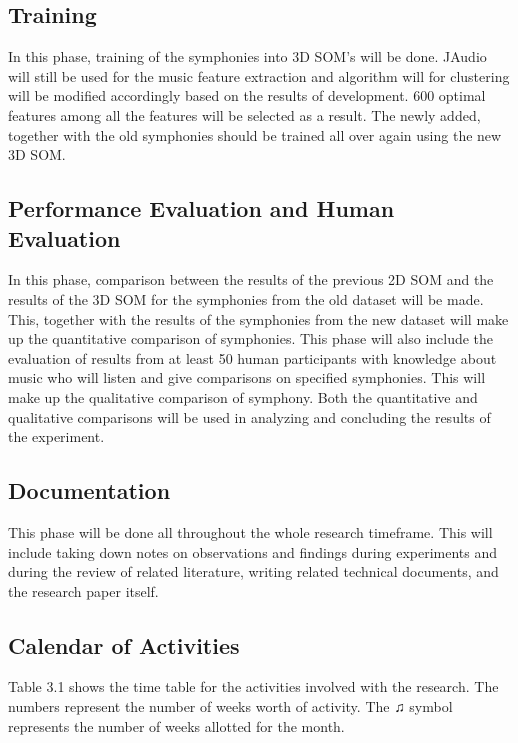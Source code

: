 \subsection{Training}
In this phase, training of the symphonies into 3D SOM’s will be done. JAudio will still be used for the music feature extraction and algorithm will for clustering will be modified accordingly based on the results of development. 600 optimal features among all the features will be selected as a result. The newly added, together with the old symphonies should be trained all over again using the new 3D SOM.

\subsection{Performance Evaluation and Human Evaluation}
In this phase, comparison between the results of the previous 2D SOM and the results of the 3D SOM for the symphonies from the old dataset will be made. This, together with the results of the symphonies from the new dataset will make up the quantitative comparison of symphonies. This phase will also include the evaluation of results from at least 50 human participants with knowledge about music who will listen and give comparisons on specified symphonies. This will make up the qualitative comparison of symphony. Both the quantitative and qualitative comparisons will be used in analyzing and concluding the results of the experiment.
\subsection{Documentation}
This phase will be done all throughout the whole research timeframe. This will include taking down notes on observations and findings during experiments and during the review of related literature, writing related technical documents, and the research paper itself.


\subsection{Calendar of Activities}
Table 3.1 shows the time table for the activities involved with the research. The numbers represent the number of weeks worth of activity. The ♫ symbol represents the number of weeks allotted for the month.